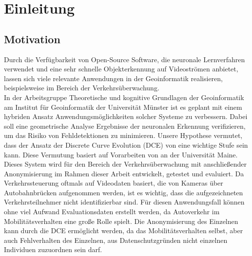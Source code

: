 \chapter{Einleitung}
\label{ch:intro}

\section{Motivation}{ 
	
Durch die Verfügbarkeit von Open-Source Software, die neuronale Lernverfahren verwendet und eine sehr schnelle Objekterkennung auf Videoströmen anbietet, lassen sich viele relevante Anwendungen in der Geoinformatik realisieren, beispielsweise im Bereich der Verkehrsüberwachung. \\
In der Arbeitsgruppe \glqq Theoretische und kognitive Grundlagen der Geoinformatik\grqq{} am Institut für Geoinformatik der Universität Münster ist es geplant mit einem hybriden Ansatz Anwendungsmöglichkeiten solcher Systeme zu verbessern. Dabei soll eine geometrische Analyse Ergebnisse der neuronalen Erkennung verifizieren, um das Risiko von Fehldetektionen zu minimieren. Unsere Hypothese vermutet, dass der Ansatz der Discrete Curve Evolution (DCE) von \citet{Latecki1999a}  eine wichtige Stufe sein kann. Diese Vermutung basiert auf Vorarbeiten von \citet*{Dorr2015} an der Universität Maine.\\

Dieses System wird für den Bereich der Verkehrsüberwachung mit anschließender Anonymisierung im Rahmen dieser Arbeit entwickelt, getestet und evaluiert. Da Verkehrssteuerung oftmals auf Videodaten basiert, die von Kameras über Autobahnbrücken aufgenommen werden, ist es wichtig, dass die aufgezeichneten Verkehrsteilnehmer nicht identifizierbar sind.  Für diesen Anwendungsfall können ohne viel Aufwand Evaluationsdaten erstellt werden, da Autoverkehr im Mobilitätsverhalten eine große Rolle spielt. Die Anonymisierung des Einzelnen kann durch die DCE ermöglicht werden, da das Mobilitätsverhalten selbst, aber auch Fehlverhalten des Einzelnen, aus Datenschutzgründen nicht einzelnen Individuen zuzuordnen sein darf.
}



